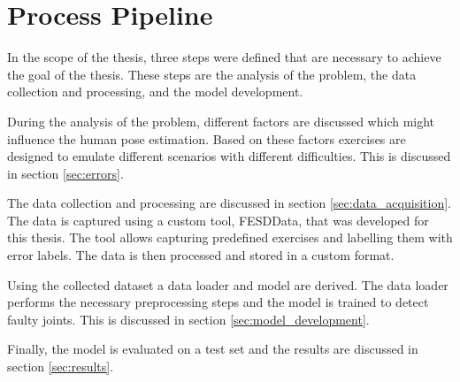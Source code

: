\section{Process Pipeline}
\label{sec:process_pipeline}

In the scope of the thesis, three steps were defined that are necessary to achieve the goal of the thesis. These steps are the analysis of the problem, the data collection and processing, and the model development.

During the analysis of the problem, different factors are discussed which might influence the human pose estimation. Based on these factors exercises are designed to emulate different scenarios with different difficulties. This is discussed in section \ref{sec:errors}.

The data collection and processing are discussed in section \ref{sec:data_acquisition}. The data is captured using a custom tool, FESDData, that was developed for this thesis. The tool allows capturing predefined exercises and labelling them with error labels. The data is then processed and stored in a custom format.

Using the collected dataset a data loader and model are derived. The data loader performs the necessary preprocessing steps and the model is trained to detect faulty joints. This is discussed in section \ref{sec:model_development}.

Finally, the model is evaluated on a test set and the results are discussed in section \ref{sec:results}.